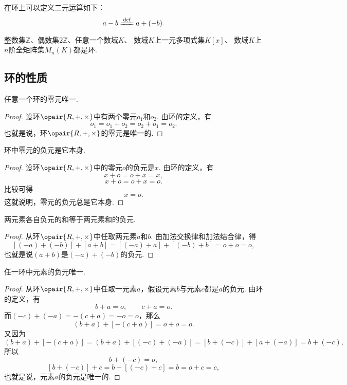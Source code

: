 在环上可以定义二元运算如下：\[
    a - b \defeq a + (-b).
\]

\begin{example}
整数集\(\mathbb{Z}\)、偶数集\(2\mathbb{Z}\)、任意一个数域\(K\)、
数域\(K\)上一元多项式集\(K[x]\)、
数域\(K\)上\(n\)阶全矩阵集\(M_n(K)\)都是环.
\end{example}

\subsection{环的性质}
\begin{property}
任意一个环的零元唯一.
\begin{proof}
设环\(\opair{R,+,\times}\)中有两个零元\(o_1\)和\(o_2\).
由环的定义，有\[
    o_1 = o_1 + o_2 = o_2 + o_1 = o_2.
\]
也就是说，环\(\opair{R,+,\times}\)的零元是唯一的.
\end{proof}
\end{property}

\begin{property}
环中零元的负元是它本身.
\begin{proof}
设环\(\opair{R,+,\times}\)中的零元\(o\)的负元是\(x\).
由环的定义，有\[
    x + o = o + x = x,
\]\[
    x + o = o + x = o.
\]比较可得\[
    x = o.
\]
这就说明，零元的负元总是它本身.
\end{proof}
\end{property}

\begin{property}
两元素各自负元的和等于两元素和的负元.
\begin{proof}
从环\(\opair{R,+,\times}\)中任取两元素\(a\)和\(b\).
由加法交换律和加法结合律，得\[
    [(-a) + (-b)] + [a + b]
    = [(-a) + a] + [(-b) + b]
    = o + o = o,
\]
也就是说\((a+b)\)是\((-a) + (-b)\)的负元.
\end{proof}
\end{property}

\begin{property}
任一环中元素的负元唯一.
\begin{proof}
从环\(\opair{R,+,\times}\)中任取一元素\(a\)，假设元素\(b\)与元素\(c\)都是\(a\)的负元.
由环的定义，有\[
    b + a = o, \qquad
    c + a = o.
\]
而\((-c) + (-a) = -(c + a) = -o = o\)，那么\[
    (b + a) + [-(c + a)]
    = o + o = o.
\]又因为\[
    (b + a) + [-(c + a)]
    = (b + a) + [(-c) + (-a)]
    = [b + (-c)] + [a + (-a)]
    = b + (-c),
\]所以\[
    b + (-c) = o,
\]\[
    [b + (-c)] + c = b + [(-c) + c] = b = o + c = c,
\]
也就是说，元素\(a\)的负元是唯一的.
\end{proof}
\end{property}

